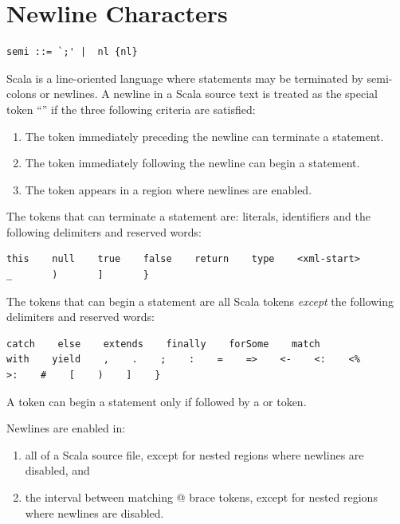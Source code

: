 \section{Newline Characters}\label{sec:newlines}

\syntax\begin{lstlisting}
semi ::= `;' |  nl {nl}
\end{lstlisting}

Scala is a line-oriented language where statements may be terminated by
semi-colons or newlines. A newline in a Scala source text is treated
as the special token ``\lstinline@nl@'' if the three following
criteria are satisfied:
\begin{enumerate}
\item
The token immediately preceding the newline can terminate a statement.
\item
The token immediately following the newline can begin a statement.
\item
The token appears in a region where newlines are enabled.
\end{enumerate}

The tokens that can terminate a statement are: literals, identifiers
and the following delimiters and reserved words:
\begin{lstlisting}
this    null    true    false    return    type    <xml-start>    
_       )       ]       }
\end{lstlisting}

The tokens that can begin a statement are all Scala tokens {\em except}
the following delimiters and reserved words:
\begin{lstlisting}
catch    else    extends    finally    forSome    match        
with    yield    ,    .    ;    :    =    =>    <-    <:    <%    
>:    #    [    )    ]    }
\end{lstlisting}
A \lstinline@case@ token can begin a statement only if followed by a
\lstinline@class@ or \lstinline@object@ token.

Newlines are enabled in:
\begin{enumerate}
\item
all of a Scala source file, except for nested regions where newlines
are disabled, and
\item
the interval between matching @ brace tokens,
except for nested regions where newlines are disabled.
\end{enumerate}


